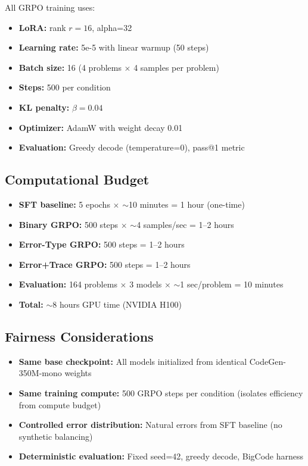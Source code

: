 All GRPO training uses:
\begin{itemize}
\item \textbf{LoRA:} rank $r=16$, alpha=32
\item \textbf{Learning rate:} 5e-5 with linear warmup (50 steps)
\item \textbf{Batch size:} 16 (4 problems $\times$ 4 samples per problem)
\item \textbf{Steps:} 500 per condition
\item \textbf{KL penalty:} $\beta=0.04$
\item \textbf{Optimizer:} AdamW with weight decay 0.01
\item \textbf{Evaluation:} Greedy decode (temperature=0), pass@1 metric
\end{itemize}

\subsection{Computational Budget}

\begin{itemize}
\item \textbf{SFT baseline:} 5 epochs $\times$ $\sim$10 minutes = 1 hour (one-time)
\item \textbf{Binary GRPO:} 500 steps $\times$ $\sim$4 samples/sec = 1--2 hours
\item \textbf{Error-Type GRPO:} 500 steps = 1--2 hours
\item \textbf{Error+Trace GRPO:} 500 steps = 1--2 hours
\item \textbf{Evaluation:} 164 problems $\times$ 3 models $\times$ $\sim$1 sec/problem = 10 minutes
\item \textbf{Total:} $\sim$8 hours GPU time (NVIDIA H100)
\end{itemize}

\subsection{Fairness Considerations}

\begin{itemize}
\item \textbf{Same base checkpoint:} All models initialized from identical CodeGen-350M-mono weights
\item \textbf{Same training compute:} 500 GRPO steps per condition (isolates efficiency from compute budget)
\item \textbf{Controlled error distribution:} Natural errors from SFT baseline (no synthetic balancing)
\item \textbf{Deterministic evaluation:} Fixed seed=42, greedy decode, BigCode harness
\end{itemize}

